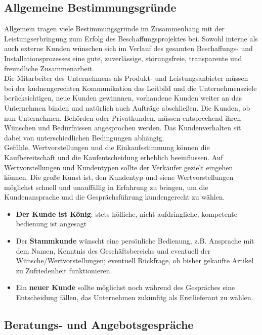 \documentclass[a4paper, 12pt]{report}
\begin{document}
\subsection{Allgemeine Bestimmungsgründe}

Allgemein tragen viele Bestimmungsgründe im Zusammenhang mit der
Leistungserbringung zum Erfolg des Beschaffungsprojektes bei. Sowohl interne als
auch externe Kunden wünschen sich im Verlauf des gesamten Beschaffungs- und
Installationsprozesses eine gute, zuverlässige, störungsfreie, transparente
und freundliche Zusammenarbeit. \\

Die Mitarbeiter des Unternehmens als Produkt- und Leistungsanbieter müssen bei
der kudnengerechten Kommunikation das Leitbild und die Unternehmensziele
berücksichtigen, neue Kunden gewinnnen, vorhandene Kunden weiter an das
Unternehmen binden und natürlich auch Aufträge abschließen. Die Kunden, ob nun
Unternehmen, Behörden oder Privatkunden, müssen entsprechend ihren Wünschen
und Bedürfnissen angesprochen werden. Das Kundenverhalten sit dabei von
unterschiedlichen Bedingungen abhängig. \\

Gefühle, Wertvorstellungen und die Einkaufsstimmung können die Kaufbereitschaft
und die Kaufentscheidung erheblich beeinflussen. Auf Wertvorstellungen und
Kundentypen sollte der Verkäufer gezielt eingehen können. Die große Kunst ist,
den Kundentyp und siene Wertvorstellungen möglichst schnell und unauffällig in
Erfahrung zu bringen, um die Kundenansprache und die Gesprächsführung
kundengerecht zu wählen.

\begin{itemize}
    \item \textbf{Der Kunde ist König}: stets höfliche, nicht aufdringliche,
	kompetente bedienung ist angesagt
    \item Der \textbf{Stammkunde} wünscht eine persönliche Bedienung, z.B.
	Ansprache mit dem Namen, Kenntnis des Geschäftsbereichs und eventuell
	der Wünsche/Wertvorstellungen; eventuell Rückfrage, ob bisher gekaufte
	Artikel zu Zufriedenheit funktionieren.
    \item Ein \textbf{neuer Kunde} sollte möglichst noch während des Gespräches
	eine Entscheidung fällen, das Unternehmen zukünfitg als
	Erstlieferant zu wählen.
\end{itemize}

\subsection{Beratungs- und Angebotsgespräche}
\end{document}
